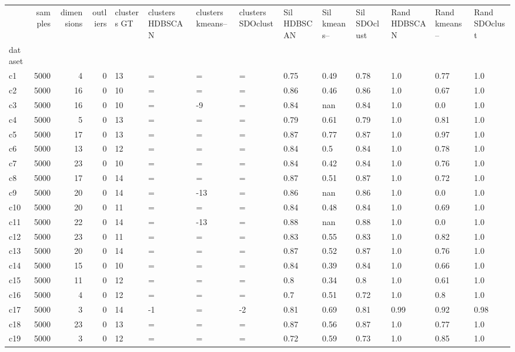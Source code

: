 \begin{tabular}{lrrrllllllllll}
\toprule
 & samples & dimensions & outliers & clusters GT & clusters HDBSCAN & clusters kmeans-- & clusters SDOclust & Sil HDBSCAN & Sil kmeans-- & Sil SDOclust & Rand HDBSCAN & Rand kmeans-- & Rand SDOclust \\
dataset &  &  &  &  &  &  &  &  &  &  &  &  &  \\
\midrule
c1 & 5000 & 4 & 0 & 13 & = & = & = & 0.75 & 0.49 & 0.78 & 1.0 & 0.77 & 1.0 \\
c2 & 5000 & 16 & 0 & 10 & = & = & = & 0.86 & 0.46 & 0.86 & 1.0 & 0.67 & 1.0 \\
c3 & 5000 & 16 & 0 & 10 & = & -9 & = & 0.84 & nan & 0.84 & 1.0 & 0.0 & 1.0 \\
c4 & 5000 & 5 & 0 & 13 & = & = & = & 0.79 & 0.61 & 0.79 & 1.0 & 0.81 & 1.0 \\
c5 & 5000 & 17 & 0 & 13 & = & = & = & 0.87 & 0.77 & 0.87 & 1.0 & 0.97 & 1.0 \\
c6 & 5000 & 13 & 0 & 12 & = & = & = & 0.84 & 0.5 & 0.84 & 1.0 & 0.78 & 1.0 \\
c7 & 5000 & 23 & 0 & 10 & = & = & = & 0.84 & 0.42 & 0.84 & 1.0 & 0.76 & 1.0 \\
c8 & 5000 & 17 & 0 & 14 & = & = & = & 0.87 & 0.51 & 0.87 & 1.0 & 0.72 & 1.0 \\
c9 & 5000 & 20 & 0 & 14 & = & -13 & = & 0.86 & nan & 0.86 & 1.0 & 0.0 & 1.0 \\
c10 & 5000 & 20 & 0 & 11 & = & = & = & 0.84 & 0.48 & 0.84 & 1.0 & 0.69 & 1.0 \\
c11 & 5000 & 22 & 0 & 14 & = & -13 & = & 0.88 & nan & 0.88 & 1.0 & 0.0 & 1.0 \\
c12 & 5000 & 23 & 0 & 11 & = & = & = & 0.83 & 0.55 & 0.83 & 1.0 & 0.82 & 1.0 \\
c13 & 5000 & 20 & 0 & 14 & = & = & = & 0.87 & 0.52 & 0.87 & 1.0 & 0.76 & 1.0 \\
c14 & 5000 & 15 & 0 & 10 & = & = & = & 0.84 & 0.39 & 0.84 & 1.0 & 0.66 & 1.0 \\
c15 & 5000 & 11 & 0 & 12 & = & = & = & 0.8 & 0.34 & 0.8 & 1.0 & 0.61 & 1.0 \\
c16 & 5000 & 4 & 0 & 12 & = & = & = & 0.7 & 0.51 & 0.72 & 1.0 & 0.8 & 1.0 \\
c17 & 5000 & 3 & 0 & 14 & -1 & = & -2 & 0.81 & 0.69 & 0.81 & 0.99 & 0.92 & 0.98 \\
c18 & 5000 & 23 & 0 & 13 & = & = & = & 0.87 & 0.56 & 0.87 & 1.0 & 0.77 & 1.0 \\
c19 & 5000 & 3 & 0 & 12 & = & = & = & 0.72 & 0.59 & 0.73 & 1.0 & 0.85 & 1.0 \\

\end{tabular}

